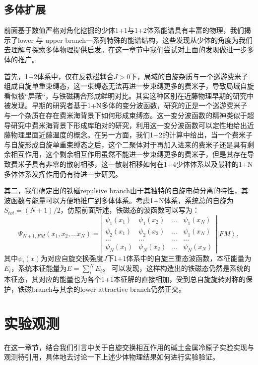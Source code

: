 \subsection{多体扩展}

前面基于数值严格对角化挖掘的少体1+1与1+2体系能谱具有丰富的物理，我们揭示了lower 与 upper branch一系列特殊的能谱结构，这些发现从少体的角度为我们去理解与探索多体物理提供启发。在这一章节中我们尝试对上面的发现做进一步多体的推广。

首先，1+2体系中，仅在反铁磁耦合$J>0$下，局域的自旋杂质与一个巡游费米子组成自旋单重束缚态，这一束缚态无法再进一步束缚更多的费米子，导致局域自旋看似被“屏蔽“，与铁磁耦合形成鲜明对比。其实这种区别在近藤物理早期的研究中被发现\cite{Yosida}。早期的研究者基于1+N多体的变分波函数，研究的正是一个巡游费米子与一个杂质在存在费米海背景下如何形成束缚态。这一变分波函数的精神类似于超导研究中费米海背景下形成库珀对的研究，利用这一变分波函数可以定性地给出近藤物理里面近藤温度的概念。在另一方面，我们1+2的计算中给出，当一个费米子与自旋形成自旋单重束缚态之后，这个二聚体对于再加入进来的费米子还是具有剩余相互作用，这个剩余相互作用虽然不能进一步束缚更多的费米子，但是其存在导致费米子具有非零的散射相移，这一散射相移如何在1+4少体体系以及最种的1+N多体体系发挥作用仍有待进一步研究。

其二，我们确定出的铁磁repulsive branch由于其独特的自旋电荷分离的特性，其波函数与能量可以方便地推广到多体体系。考虑1+N体系，系统总的自旋为$S_{tot}=(N+1)/2$，仿照前面所述，铁磁态的波函数可以写为：
\begin{equation}
\Psi_{N+1,FM}(x_1,x_2,...x_N)=\left|\begin{array}{cccc}\psi_1(x_1) & \psi_1(x_2) & ... &\psi_1(x_N)  \\ \psi_2(x_1) & \psi_2(x_2) & ... &\psi_1(x_N) \\
... & ... & ... &... \\
\psi_N(x_1) & \psi_N(x_2) & ... &\psi_N(x_N)\end{array}\right| \left|FM\right>,
\end{equation}
其中$\psi_i(x)$为对应自旋交换强度$J$下1+1体系中的自旋三重态波函数，本征能量为$E_i$，系统本征能量为$E = \sum_i^N E_i$。
可以发现，这样构造出的铁磁态仍然是系统的本征态，其对应的能量也为各个1+1本征解的直接相加，受到总自旋旋转对称的保护，铁磁branch与其余的lower attractive branch仍然正交。

\section{实验观测}
在这一章节，结合我们引言中关于自旋交换相互作用的碱土金属冷原子实验实现与观测{\color{red}待引用}，具体地去讨论一下上述少体物理结果如何进行实验验证。

